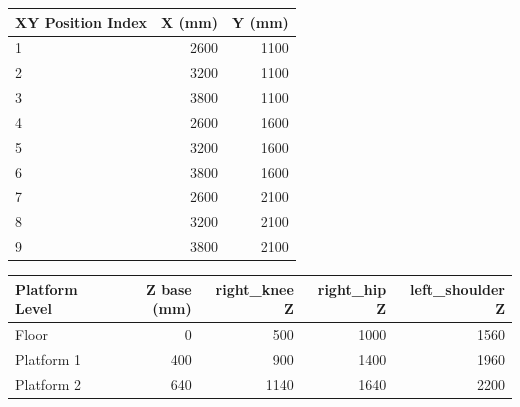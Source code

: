 {\small
\begin{center}
\label{tab:app_c_jt_xy}
\begin{tabular}{|l|r|r|}
\hline
\textbf{XY Position Index} & \textbf{X (mm)} & \textbf{Y (mm)} \\
\hline
1 & 2600 & 1100 \\
\hline
2 & 3200 & 1100 \\
\hline
3 & 3800 & 1100 \\
\hline
4 & 2600 & 1600 \\
\hline
5 & 3200 & 1600 \\
\hline
6 & 3800 & 1600 \\
\hline
7 & 2600 & 2100 \\
\hline
8 & 3200 & 2100 \\
\hline
9 & 3800 & 2100 \\
\hline
\end{tabular}
\end{center}

\begin{center}
\label{tab:app_c_jt_heights}
\begin{tabular}{|l|r|r|r|r|}
\hline
\textbf{Platform Level} & \textbf{Z base (mm)} & \textbf{right\_knee Z} & \textbf{right\_hip Z} & \textbf{left\_shoulder Z} \\
\hline
Floor & 0 & 500 & 1000 & 1560 \\
\hline
Platform 1 & 400 & 900 & 1400 & 1960 \\
\hline
Platform 2 & 640 & 1140 & 1640 & 2200 \\
\hline
\end{tabular}
\end{center}
}
